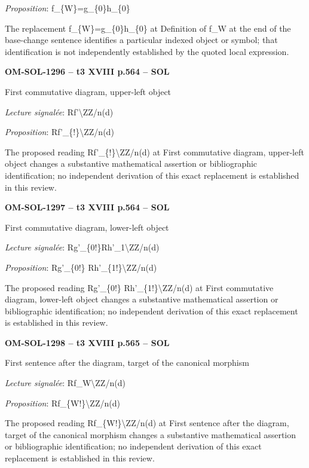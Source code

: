 \emph{Proposition}: f\_\{W\}=\allowbreak g\_\{0\}h\_\{0\}\par
The replacement f\_\{W\}=\allowbreak g\_\{0\}h\_\{0\} at Definition of f\_W at the end of the base-change sentence identifies a particular indexed object or symbol; that identification is not independently established by the quoted local expression.\par
\par\noindent\textbf{OM-SOL-1296 -- t3 XVIII p.564 -- SOL}\par
First commutative diagram, upper-left object\par
\emph{Lecture signalée}: Rf'\textbackslash{}ZZ/n(d)\par
\emph{Proposition}: Rf'\_\{!\}\textbackslash{}ZZ/n(d)\par
The proposed reading Rf'\_\{!\}\textbackslash{}ZZ/n(d) at First commutative diagram, upper-left object changes a substantive mathematical assertion or bibliographic identification; no independent derivation of this exact replacement is established in this review.\par
\par\noindent\textbf{OM-SOL-1297 -- t3 XVIII p.564 -- SOL}\par
First commutative diagram, lower-left object\par
\emph{Lecture signalée}: Rg'\_\{0!\}Rh'\_1\textbackslash{}ZZ/n(d)\par
\emph{Proposition}: Rg'\_\{0!\} Rh'\_\{1!\}\textbackslash{}ZZ/n(d)\par
The proposed reading Rg'\_\{0!\} Rh'\_\{1!\}\textbackslash{}ZZ/n(d) at First commutative diagram, lower-left object changes a substantive mathematical assertion or bibliographic identification; no independent derivation of this exact replacement is established in this review.\par
\par\noindent\textbf{OM-SOL-1298 -- t3 XVIII p.565 -- SOL}\par
First sentence after the diagram, target of the canonical morphism\par
\emph{Lecture signalée}: Rf\_W\textbackslash{}ZZ/n(d)\par
\emph{Proposition}: Rf\_\{W!\}\textbackslash{}ZZ/n(d)\par
The proposed reading Rf\_\{W!\}\textbackslash{}ZZ/n(d) at First sentence after the diagram, target of the canonical morphism changes a substantive mathematical assertion or bibliographic identification; no independent derivation of this exact replacement is established in this review.\par
